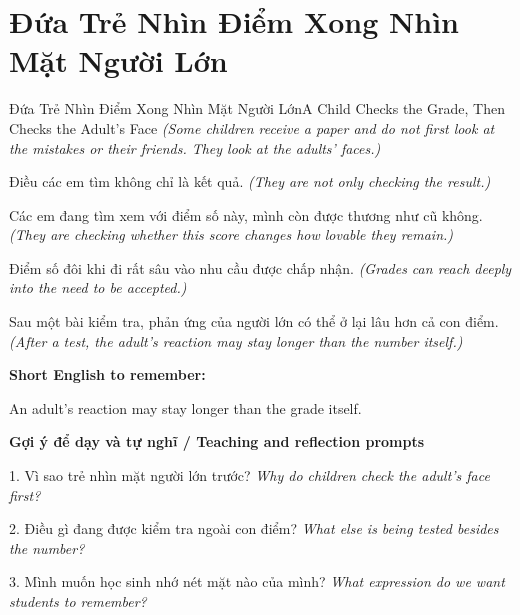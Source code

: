 \section{Đứa Trẻ Nhìn Điểm Xong Nhìn Mặt Người Lớn}
\begin{truyen}{Đứa Trẻ Nhìn Điểm Xong Nhìn Mặt Người Lớn}{A Child Checks the Grade, Then Checks the Adult’s Face}
\textit{(Some children receive a paper and do not first look at the mistakes or their friends. They look at the adults’ faces.)}

Điều các em tìm không chỉ là kết quả.
\textit{(They are not only checking the result.)}

Các em đang tìm xem với điểm số này, mình còn được thương như cũ không.
\textit{(They are checking whether this score changes how lovable they remain.)}

Điểm số đôi khi đi rất sâu vào nhu cầu được chấp nhận.
\textit{(Grades can reach deeply into the need to be accepted.)}

\end{truyen}

\begin{baihoc}
Sau một bài kiểm tra, phản ứng của người lớn có thể ở lại lâu hơn cả con điểm.
\textit{(After a test, the adult’s reaction may stay longer than the number itself.)}
\end{baihoc}

\begin{ghinhoanh}
\textbf{Short English to remember:}

An adult’s reaction may stay longer than the grade itself.

\end{ghinhoanh}

\begin{tuhocnhanh}
\textbf{Gợi ý để dạy và tự nghĩ / Teaching and reflection prompts}

1. Vì sao trẻ nhìn mặt người lớn trước? \textit{Why do children check the adult’s face first?}

2. Điều gì đang được kiểm tra ngoài con điểm? \textit{What else is being tested besides the number?}

3. Mình muốn học sinh nhớ nét mặt nào của mình? \textit{What expression do we want students to remember?}
\end{tuhocnhanh}
\ngancach

